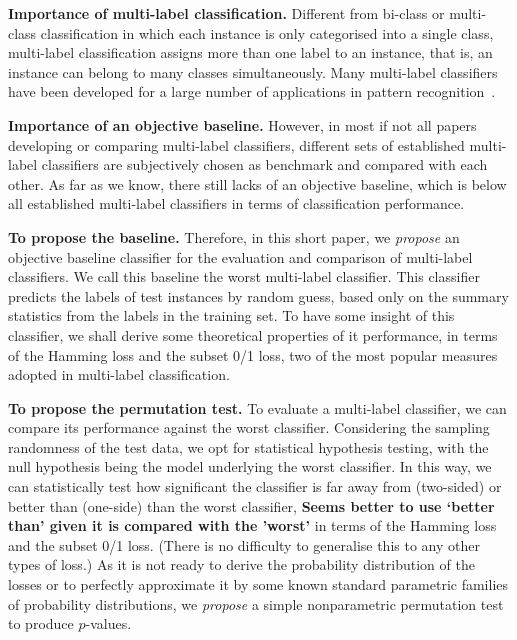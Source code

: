 \documentclass[review]{elsarticle}
\begin{document}
{\bf Importance of multi-label classification.}
Different from bi-class or multi-class classification in which each instance is only categorised into a single class, multi-label classification assigns more than one label to an instance, that is, an instance can belong to many classes simultaneously.  Many multi-label classifiers have been developed for a large number of applications in pattern recognition~\citep{Tsoumakas:07, de2009tutorial, zhang2014review, Gibaja:15, wu2015multi, zhao2015multi, zhao2015joint, li2015supervised, li2015centroid, meng2016plant, li2016conditional, hou2016multi, ivasic2016two, yang2016exploiting}.  

{\bf Importance of an objective baseline.}
However, in most if not all papers developing or comparing multi-label classifiers, different sets of established multi-label classifiers are subjectively chosen as benchmark and compared with each other.  As far as we know, there still lacks of an objective baseline, which is below all established multi-label classifiers in terms of classification performance.

{\bf To propose the baseline.}
Therefore, in this short paper, we {\em propose} an objective baseline classifier for the evaluation and comparison of multi-label classifiers.  We call this baseline the worst multi-label classifier.  This classifier predicts the labels of test instances by random guess, based only on the summary statistics from the labels in the training set.  To have some insight of this classifier, we shall derive some theoretical properties of it performance, in terms of the Hamming loss and the subset 0/1 loss, two of the most popular measures adopted in multi-label classification.

{\bf To propose the permutation test.}
To evaluate a multi-label classifier, we can compare its performance against the worst classifier.  Considering the sampling randomness of the test data, we opt for statistical hypothesis testing, with the null hypothesis being the model underlying the worst classifier.  In this way, we can statistically test how significant the classifier is far away from (two-sided) or better than (one-side) than the worst classifier, {\bf Seems better to use `better than' given it is compared with the 'worst'} in terms of the Hamming loss and the subset 0/1 loss.  (There is no difficulty to generalise this to any other types of loss.)  As it is not ready to derive the probability distribution of the losses or to perfectly approximate it by some known standard parametric families of probability distributions, we {\em propose} a simple nonparametric permutation test to produce $p$-values.  
\end{document}
